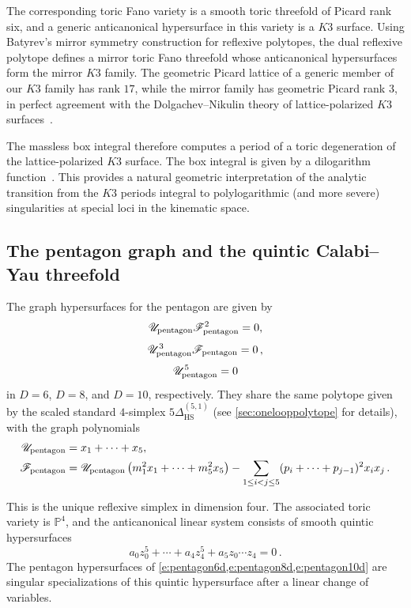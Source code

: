 \documentclass[12pt,a4paper]{article}
\theoremstyle{plain}
\theoremstyle{remark}
\newcommand{\cU}{\mathscr {U}}
\newcommand{\cF}{\mathscr {F}}
\newcommand{\Newton}{\Delta}
\newcommand{\simplexwithpars}[1]{\Newton_{\text{HS}}^{(#1)}}
\begin{document}
The corresponding toric Fano variety is a smooth toric threefold of
Picard rank six, and a generic anticanonical hypersurface in this
variety is a $K3$ surface. Using Batyrev's mirror symmetry
construction for reflexive polytopes, the dual
reflexive polytope defines a mirror toric Fano threefold whose
anticanonical hypersurfaces form the mirror $K3$ family. The geometric Picard
lattice of a generic member of our $K3$ family has rank $17$, while
the mirror family has geometric Picard rank $3$, in perfect agreement with the
Dolgachev--Nikulin theory of lattice-polarized $K3$
surfaces~\cite{Dolgachev1996,Nikulin1980}. 


The massless box integral therefore computes a period of a toric
degeneration of the  lattice-polarized $K3$ surface. The box integral
is given by a dilogarithm function~\cite{tHooft:1978jhc}.
This provides a natural geometric interpretation of the analytic
transition from the $K3$ periods integral to polylogarithmic (and more severe) singularities at special loci in the kinematic space.




\subsection{The pentagon graph and the quintic Calabi--Yau threefold}\label{sec:pentagon-graph-CY}

The graph hypersurfaces for the pentagon are given by
%
\begin{equation}\label{e:pentagon6d}\cU_{\rm pentagon}\cF_{\rm pentagon}^2=0,\end{equation}   \begin{equation}\label{e:pentagon8d}\cU_{\rm pentagon}^3\cF_{\rm pentagon}=0\, ,\end{equation}
\begin{equation}\label{e:pentagon10d}\cU_{\rm pentagon}^5=0\end{equation}
in $D=6$, $D=8$,
and $D=10$, respectively.  They share the same polytope given by the scaled standard $4$-simplex $5\simplexwithpars{5,1}$ (see
\cref{sec:onelooppolytope} for details), with the graph polynomials
\begin{align}
    \cU_{\rm pentagon}&=x_1+\cdots +x_5,\\
\nonumber    \cF_{\rm pentagon}&=\cU_{\rm pentagon}\left(m_1^2x_1+\cdots +m_5^2x_5\right)-\sum_{1\leq i<j\leq 5} (p_i+\cdots +p_{j-1})^2 x_ix_j\,.
\end{align}

This is the unique reflexive simplex in dimension four.
The associated toric variety is $\mathbb{P}^4$, and the anticanonical
linear system consists of smooth quintic hypersurfaces
\begin{equation}
    a_0z_0^5+\cdots +a_4z_4^5+a_5z_0\cdots z_4=0\,.
\end{equation}
The pentagon hypersurfaces of \cref{e:pentagon6d,e:pentagon8d,e:pentagon10d} are singular specializations of this quintic hypersurface after a linear change of variables.
\end{document}
